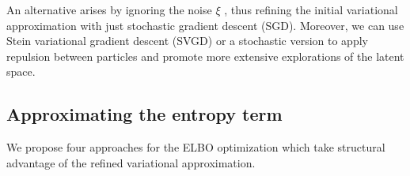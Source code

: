 An alternative arises by ignoring the noise $\xi$ \cite{mandt2017stochastic}, thus refining the initial variational approximation with just stochastic gradient descent (SGD).
 Moreover, we can use Stein variational gradient descent (SVGD) \cite{liu2016stein} or a stochastic version \cite{gallego2018stochastic} to apply repulsion between particles and promote more extensive explorations of the latent space. %

\subsection{Approximating the entropy term}\label{sec:approx}

We propose four approaches for the ELBO optimization 
which take structural advantage of the refined variational approximation.

